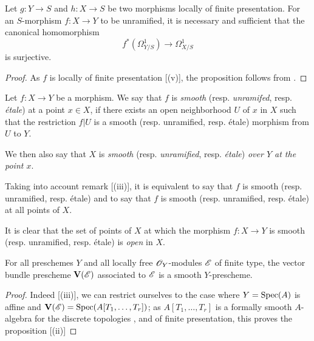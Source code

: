 \begin{proposition}[17.3.6]
\label{IV.17.3.6}
Let $g:Y\to S$ and $h:X\to S$ be two morphisms locally of finite presentation.
For an $S$-morphism $f:X\to Y$ to be unramified, it is necessary and sufficient that the canonical homomorphism 
\[
  f^*(\Omega_{Y/S}^1)\to\Omega_{X/S}^1
\]
is surjective.
\end{proposition}

\begin{proof}
As $f$ is locally of finite presentation [(v)], the proposition follows from .
\end{proof}

\begin{definition}[17.3.7]
\label{IV.17.3.7}
Let $f:X\to Y$ be a morphism.
We say that $f$ is \emph{smooth} (resp. \emph{unramifed}, resp. \emph{\'etale}) at a point $x\in X$, if there exists an open neighborhood $U$ of $x$ in $X$ such that the restriction $f|U$ is a smooth (resp. unramified, resp. \'etale) morphism from $U$ to $Y$.
\end{definition}

We then also say that $X$ is \emph{smooth} (resp. \emph{unramified}, resp. \emph{\'etale}) \emph{over $Y$ at the point $x$}.

Taking into account remark [(iii)], it is equivalent to say that $f$ is smooth (resp. unramified, resp. \'etale) and to say that $f$ is smooth (resp. unramified, resp. \'etale) at all points of $X$.

It is clear that the set of points of $X$ at which the morphism $f:X\to Y$ is smooth (resp. unramified, resp. \'etale) is \emph{open} in $X$.

\begin{proposition}[17.3.8]
\label{IV.17.3.8}
For all preschemes $Y$ and all locally free $\mathscr{O}_Y$-modules $\mathscr{E}$ of finite type, the vector bundle prescheme $\mathbf{V}(\mathscr{E})$  associated to $\mathscr{E}$ is a smooth $Y$-prescheme.
\end{proposition}

\begin{proof}
Indeed [(iii)], we can restrict ourselves to the case where $Y=\operatorname{Spec}(A)$ is affine and $\mathbf{V}(\mathscr{E})=\operatorname{Spec}(A[T_1,\dots,T_r])$;
as $A[T_1,\dots,T_r]$ is a formally smooth $A$-algebra for the discrete topologies , and of finite presentation, this proves the proposition [(ii)] 
\end{proof}

